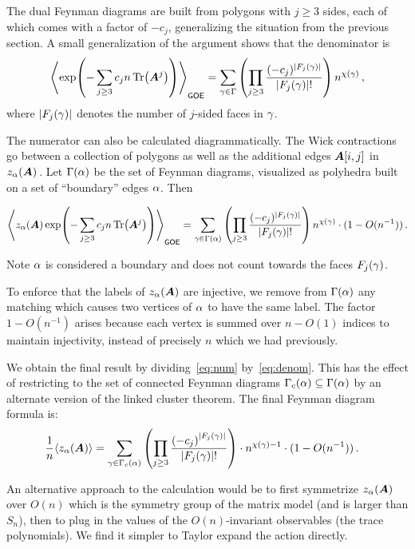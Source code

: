 The dual Feynman diagrams are built from polygons with $j\ge 3$ sides, each of which comes with a factor of $-c_j$, generalizing the situation from the previous section.
A small generalization of the argument
shows that the denominator is
\begin{equation}\label{eq:denom}
    \left\langle \exp(-\sum_{j \geq 3} c_j n \Tr({\bm A}^j)) \right\rangle_\textsf{\upshape GOE} = \sum_{\gamma \in \Gamma} \left(\prod_{j \geq 3} \frac{(-c_j)^{|F_j(\gamma)|}}{|F_j(\gamma)|!}\right) n^{\chi(\gamma)}\,,
\end{equation}
where $|F_j(\gamma)|$ denotes the number of $j$-sided faces in $\gamma$.

The numerator can also be calculated diagrammatically.
The Wick contractions go between a collection of polygons as well as the additional edges ${\bm A}[i,j]$ in $z_\alpha({\bm A})$\,.
Let $\Gamma(\alpha)$ be the set of Feynman diagrams, visualized as polyhedra built on a set of ``boundary'' edges $\alpha$.
Then

\begin{equation}\label{eq:num}
    \left\langle z_\alpha({\bm A}) \exp(-\sum_{j \geq 3} c_j n \Tr({\bm A}^j)) \right\rangle_\textsf{\upshape GOE} = \sum_{\gamma \in \Gamma(\alpha)} \left(\prod_{j \geq 3} \frac{(-c_j)^{|F_j(\gamma)|}}{|F_j(\gamma)|!}\right) n^{\chi(\gamma)}\cdot(1-O(n^{-1}))\,.
\end{equation}

Note $\alpha$ is considered a boundary and does not count towards the faces $F_j(\gamma)$.

To enforce that the labels of $z_\alpha({\bm A})$ are injective, we remove from $\Gamma(\alpha)$ any matching which causes two vertices of $\alpha$ to have the same label.
The factor $1-O(n^{-1})$ arises because each vertex is summed over $n - O(1)$ indices to maintain injectivity, instead of precisely $n$ which we had previously.

We obtain the final result by
dividing~\cref{eq:num} by~\cref{eq:denom}.
This has the effect of restricting to the set of connected Feynman diagrams $\Gamma_c(\alpha) \subseteq \Gamma(\alpha)$ by an alternate version of the linked cluster theorem.
The final Feynman diagram formula is:
\begin{align}
    \frac 1n \langle z_\alpha({\bm A})\rangle &= \sum_{\gamma \in \Gamma_c(\alpha)} \left(\prod_{j \geq 3}\frac{\left(-c_j\right)^{|F_j(\gamma)|}}{|F_j(\gamma)|!} \right) \cdot n^{\chi(\gamma)-1}\cdot(1-O(n^{-1}))\,. \label{eq:feynman-alpha}
\end{align}

\begin{remark}
An alternative approach to the calculation would be to first symmetrize $z_\alpha({\bm A})$ over $O(n)$ 
which is the symmetry group of the matrix model (and is larger than $S_n$),
then to plug in the values of the $O(n)$-invariant observables (the trace polynomials).
We find it simpler to Taylor expand the action directly.
\end{remark}

